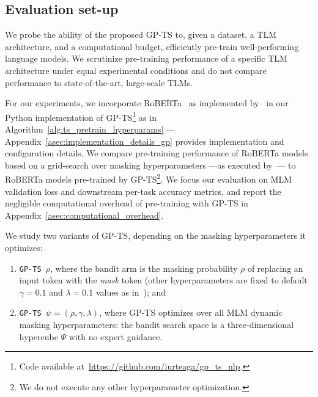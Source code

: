 
\subsection{Evaluation set-up}
\label{ssec:set_up}

We probe the ability of the proposed GP-TS to,
given a dataset, a TLM architecture, and a computational budget,
efficiently pre-train well-performing language models.
We scrutinize pre-training performance of a specific TLM architecture under equal experimental conditions 
and do not compare performance to state-of-the-art, large-scale TLMs.

For our experiments,
we incorporate RoBERTa~\citep{roberta} as implemented by~\citet{fairseq}
in our Python implementation of GP-TS\footnote{
	Code available at~\href{https://github.com/iurteaga/gp_ts_nlp}{https://github.com/iurteaga/gp\_ts\_nlp}.
} as in Algorithm~\ref{alg:ts_pretrain_hyperparams}
---Appendix~\ref{asec:implementation_details_gp} provides implementation and configuration details.
We compare pre-training performance of RoBERTa models
based on a grid-search over masking hyperparameters ---as executed by~\citet{roberta}---
to RoBERTa models pre-trained by GP-TS\footnote{
	We do not execute any other hyperparameter optimization.
}.
%
We focus our evaluation on MLM validation loss and downstream per-task accuracy metrics,
and report the negligible computational overhead of pre-training with GP-TS in Appendix~\ref{asec:computational_overhead}. 

We study two variants of GP-TS, depending on the masking hyperparameters it optimizes:
\begin{enumerate}
	\vspace*{-1ex}
	\item \texttt{GP-TS $\rho$}, where the bandit arm is the masking probability $\rho$ of replacing an input token with the \textit{mask} token
	(other hyperparameters are fixed to default $\gamma=0.1$ and $\lambda=0.1$ values as in~\citet{roberta});
	and 
	\vspace*{-1ex}
	\item \texttt{GP-TS $\psi=\left(\rho, \gamma, \lambda\right)$},
	where GP-TS optimizes over all MLM dynamic masking hyperparameters:
	the bandit search space is a three-dimensional hypercube $\Psi$
	with no expert guidance. %
	\vspace*{-1ex}
\end{enumerate}

